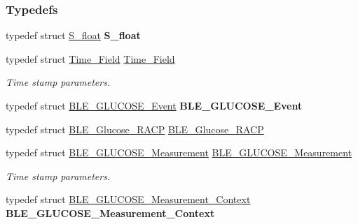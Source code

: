 \subsubsection*{Typedefs}
\begin{DoxyCompactItemize}
\item 
typedef struct \hyperlink{struct_s__float}{S\+\_\+float} {\bfseries S\+\_\+float}\hypertarget{group___b_l_e___g_s_ga9d1e332e81ce1e7d15b0c539d85ac9d0}{}\label{group___b_l_e___g_s_ga9d1e332e81ce1e7d15b0c539d85ac9d0}

\item 
typedef struct \hyperlink{struct_time___field}{Time\+\_\+\+Field} \hyperlink{group___b_l_e___g_s_ga8d554aac0512406a308b84a3392623fa}{Time\+\_\+\+Field}\hypertarget{group___b_l_e___g_s_ga8d554aac0512406a308b84a3392623fa}{}\label{group___b_l_e___g_s_ga8d554aac0512406a308b84a3392623fa}

\begin{DoxyCompactList}\small\item\em Time stamp parameters. \end{DoxyCompactList}\item 
typedef struct \hyperlink{struct_b_l_e___g_l_u_c_o_s_e___event}{B\+L\+E\+\_\+\+G\+L\+U\+C\+O\+S\+E\+\_\+\+Event} {\bfseries B\+L\+E\+\_\+\+G\+L\+U\+C\+O\+S\+E\+\_\+\+Event}\hypertarget{group___b_l_e___g_s_ga2608d39b298d18f49f98c513a595ff5d}{}\label{group___b_l_e___g_s_ga2608d39b298d18f49f98c513a595ff5d}

\item 
typedef struct \hyperlink{struct_b_l_e___glucose___r_a_c_p}{B\+L\+E\+\_\+\+Glucose\+\_\+\+R\+A\+CP} \hyperlink{group___b_l_e___g_s_gad603a274a4f36aa80acc5e6d8cdf792d}{B\+L\+E\+\_\+\+Glucose\+\_\+\+R\+A\+CP}
\item 
typedef struct \hyperlink{struct_b_l_e___g_l_u_c_o_s_e___measurement}{B\+L\+E\+\_\+\+G\+L\+U\+C\+O\+S\+E\+\_\+\+Measurement} \hyperlink{group___b_l_e___g_s_ga8be1fbb6fa8e32337f5d100f6653e06e}{B\+L\+E\+\_\+\+G\+L\+U\+C\+O\+S\+E\+\_\+\+Measurement}
\begin{DoxyCompactList}\small\item\em Time stamp parameters. \end{DoxyCompactList}\item 
typedef struct \hyperlink{struct_b_l_e___g_l_u_c_o_s_e___measurement___context}{B\+L\+E\+\_\+\+G\+L\+U\+C\+O\+S\+E\+\_\+\+Measurement\+\_\+\+Context} {\bfseries B\+L\+E\+\_\+\+G\+L\+U\+C\+O\+S\+E\+\_\+\+Measurement\+\_\+\+Context}\hypertarget{group___b_l_e___g_s_ga9631bf5a7e7002d0911b94f6db0fe91a}{}\label{group___b_l_e___g_s_ga9631bf5a7e7002d0911b94f6db0fe91a}


\end{DoxyCompactItemize}
